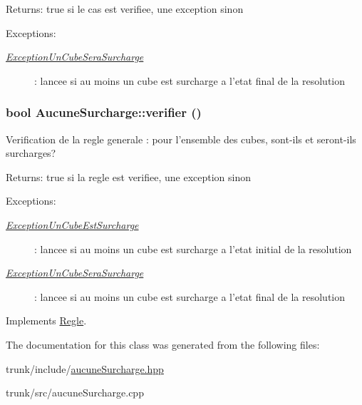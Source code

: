 \begin{Desc}
\item[Returns:]true si le cas est verifiee, une exception sinon \end{Desc}
\begin{Desc}
\item[Exceptions:]
\begin{description}
\item[{\em \hyperlink{classExceptionUnCubeSeraSurcharge}{ExceptionUnCubeSeraSurcharge}}]: lancee si au moins un cube est surcharge a l'etat final de la resolution \end{description}
\end{Desc}
\hypertarget{classAucuneSurcharge_d96084db10b49f9c48f6cb005248f7c4}{
\subsubsection[{verifier}]{\setlength{\rightskip}{0pt plus 5cm}bool AucuneSurcharge::verifier ()}}
\label{classAucuneSurcharge_d96084db10b49f9c48f6cb005248f7c4}


Verification de la regle generale : pour l'ensemble des cubes, sont-ils et seront-ils surcharges? 

\begin{Desc}
\item[Returns:]true si la regle est verifiee, une exception sinon\end{Desc}
\begin{Desc}
\item[Exceptions:]
\begin{description}
\item[{\em \hyperlink{classExceptionUnCubeEstSurcharge}{ExceptionUnCubeEstSurcharge}}]: lancee si au moins un cube est surcharge a l'etat initial de la resolution \item[{\em \hyperlink{classExceptionUnCubeSeraSurcharge}{ExceptionUnCubeSeraSurcharge}}]: lancee si au moins un cube est surcharge a l'etat final de la resolution \end{description}
\end{Desc}


Implements \hyperlink{classRegle_4b3de9a64ec0e948e9177026afcc073d}{Regle}.

The documentation for this class was generated from the following files:\begin{CompactItemize}
\item 
trunk/include/\hyperlink{aucuneSurcharge_8hpp}{aucuneSurcharge.hpp}\item 
trunk/src/aucuneSurcharge.cpp\end{CompactItemize}

